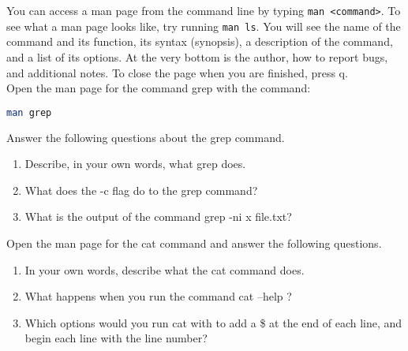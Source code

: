 \documentclass[11pt,a4paper]{article}
\begin{document}
You can access a man page from the command line by typing \verb|man <command>|. To see what a man page looks like, try running \verb|man ls|. You will see the name of the command and its function, its syntax (synopsis), a description of the command, and a list of its options. At the very bottom is the author, how to report bugs, and additional notes. To close the page when you are finished, press q. \\

Open the man page for the command grep with the command:

\begin{lstlisting}[basicstyle=\ttfamily, backgroundcolor = \color{lightgray}, language = bash, xleftmargin = 0cm, framexleftmargin = 1em]
man grep
\end{lstlisting}

Answer the following questions about the grep command.

\begin{enumerate}
\item Describe, in your own words, what grep does.
\newline
\newline
\item What does the -c flag do to the grep command?
\newline
\newline
\item What is the output of the command grep -ni x file.txt?
\newline
\newline
\newline
\end{enumerate}

Open the man page for the cat command and answer the following questions.

\begin{enumerate}
\item In your own words, describe what the cat command does.
\newline
\newline
\item What happens when you run the command cat --help ?
\newline
\newline
\item Which options would you run cat with to add a \$ at the end of each line, and begin each line with the line number?
\newline
\newline
\newline
\end{enumerate}
\end{document}
